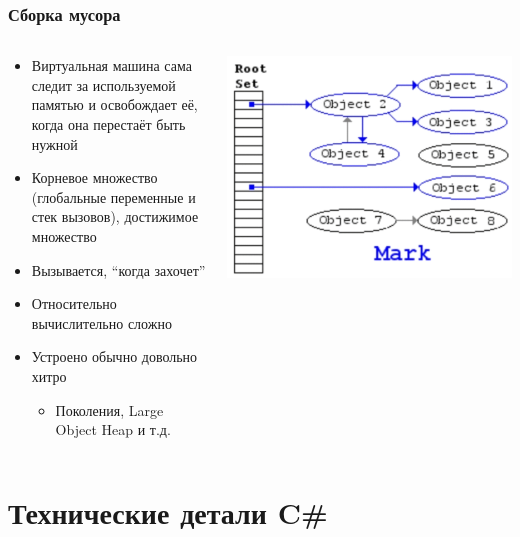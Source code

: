 \documentclass[xetex,mathserif,serif]{beamer}
\begin{document}
	\begin{frame}
		\frametitle{Сборка мусора}
		\begin{columns}
			\begin{column}{0.6\textwidth}
				\begin{itemize}
					\item Виртуальная машина сама следит за используемой памятью и освобождает её, когда она перестаёт быть нужной
					\item Корневое множество (глобальные переменные и стек вызовов), достижимое множество
					\item Вызывается, ``когда захочет''
					\item Относительно вычислительно сложно
					\item Устроено обычно довольно хитро
					\begin{itemize}
						\item Поколения, Large Object Heap и т.д.
					\end{itemize}
				\end{itemize}
			\end{column}
			\begin{column}{0.4\textwidth}
				\includegraphics[width=\textwidth]{markAndSweep.png}
			\end{column}
		\end{columns}
	\end{frame}

	\section{Технические детали C\#}
\end{document}
